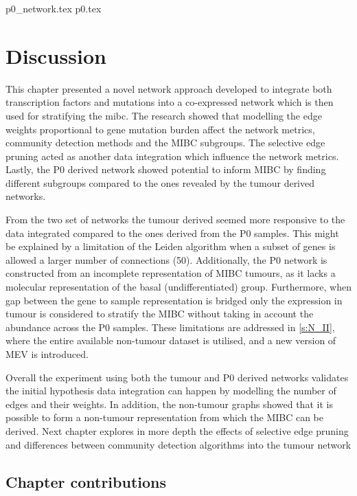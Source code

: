 {p0_network.tex}
{p0.tex}


\section{Discussion}


This chapter presented a novel network approach developed to integrate both transcription factors and mutations into a co-expressed network which is then used for stratifying the \acrlong{mibc}. The research showed that modelling the edge weights proportional to gene mutation burden affect the network metrics, community detection methods and the MIBC subgroups. The selective edge pruning  acted as another data integration which influence the network metrics. Lastly, the P0 derived network showed potential to inform MIBC by finding different subgroups compared to the ones revealed by the tumour derived networks.

From the two set of networks the tumour derived seemed more responsive to the data integrated compared to the ones derived from the P0 samples. This might be explained by a limitation of the Leiden algorithm when a subset of genes is allowed a larger number of connections (50). Additionally, the P0 network is constructed from an incomplete representation of MIBC tumours, as it lacks a molecular representation of the basal (undifferentiated) group. Furthermore, when gap between the gene to sample representation is bridged only the expression in tumour is considered to stratify the MIBC without taking in account the abundance across the P0 samples. These limitations are addressed in \cref{s:N_II}, where the entire available non-tumour dataset is utilised, and a new version of MEV is introduced.


Overall the experiment using both the tumour and P0 derived networks validates the initial hypothesis data integration can happen by modelling the number of edges and their weights. In addition, the non-tumour graphs showed that it is possible to form a non-tumour representation from which the MIBC can be derived. Next chapter explores in more depth the effects of selective edge pruning and differences between community detection algorithms into the tumour network

\subsection{Chapter contributions}

